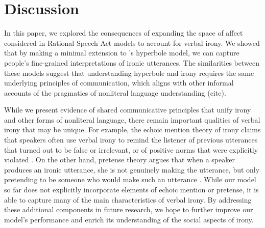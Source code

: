 \documentclass[10pt,letterpaper]{article}
\begin{document}

\section{Discussion}
In this paper, we explored the consequences of expanding the space of affect considered in Rational Speech Act models to account for verbal irony. We showed that by making a minimal extension to 's hyperbole model, we can capture people's fine-grained interpretations of ironic utterances. The similarities between these models suggest that understanding hyperbole and irony requires the same underlying principles of communication, which aligns with other informal accounts of the pragmatics of nonliteral language understanding (cite).  

While we present evidence of shared communicative principles that unify irony and other forms of nonliteral language, there remain important qualities of verbal irony that may be unique. For example, the echoic mention theory of irony claims that speakers often use verbal irony to remind the listener of previous utterances that turned out to be false or irrelevant, or of positive norms that were explicitly violated \cite{sperber1981irony, jorgensen1984test}. On the other hand, pretense theory argues that when a speaker produces an ironic utterance, she is not genuinely making the utterance, but only pretending to be someone who would make such an utterance \cite{clark1984pretense}. 
While our model so far does not explicitly incorporate elements of echoic mention or pretense, it is able to capture many of the main characteristics of verbal irony. By addressing these additional components in future research, we hope to further improve our model's performance and enrich its understanding of the social aspects of irony. 
\end{document}
